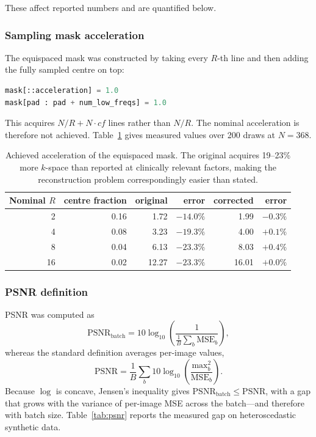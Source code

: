 \documentclass[11pt]{article}
\begin{document}
These affect reported numbers and are quantified below.

\subsubsection{Sampling mask acceleration}

The equispaced mask was constructed by taking every $R$-th line and then adding
the fully sampled centre on top:
\begin{lstlisting}[language=Python]
mask[::acceleration] = 1.0
mask[pad : pad + num_low_freqs] = 1.0
\end{lstlisting}
This acquires $N/R + N\cdot\mathit{cf}$ lines rather than $N/R$. The nominal
acceleration is therefore not achieved. Table~\ref{tab:mask} gives measured
values over 200 draws at $N=368$.

\begin{table}[h]
\centering
\small
\begin{tabular}{@{}rrrrrr@{}}
\toprule
Nominal $R$ & centre fraction & original & error & corrected & error \\
\midrule
2  & 0.16 & 1.72  & $-14.0\%$ & 1.99  & $-0.3\%$ \\
4  & 0.08 & 3.23  & $-19.3\%$ & 4.00  & $+0.1\%$ \\
8  & 0.04 & 6.13  & $-23.3\%$ & 8.03  & $+0.4\%$ \\
16 & 0.02 & 12.27 & $-23.3\%$ & 16.01 & $+0.0\%$ \\
\bottomrule
\end{tabular}
\caption{Achieved acceleration of the equispaced mask. The original acquires
19--23\% more $k$-space than reported at clinically relevant factors, making the
reconstruction problem correspondingly easier than stated.}
\label{tab:mask}
\end{table}

\subsubsection{PSNR definition}

PSNR was computed as
\begin{equation}
\mathrm{PSNR}_{\text{batch}} = 10\log_{10}\!\left(\frac{1}{\frac{1}{B}\sum_b \mathrm{MSE}_b}\right),
\end{equation}
whereas the standard definition averages per-image values,
\begin{equation}
\mathrm{PSNR} = \frac{1}{B}\sum_b 10\log_{10}\!\left(\frac{\mathrm{max}_b^2}{\mathrm{MSE}_b}\right).
\end{equation}
Because $\log$ is concave, Jensen's inequality gives
$\mathrm{PSNR}_{\text{batch}} \le \mathrm{PSNR}$, with a gap that grows with the
variance of per-image MSE across the batch---and therefore with batch size.
Table~\ref{tab:psnr} reports the measured gap on heteroscedastic synthetic data.
\end{document}
